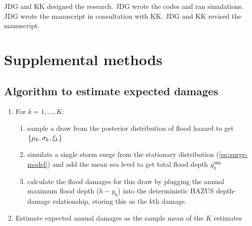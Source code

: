 \documentclass[12pt]{article}
\begin{document}
JDG and KK designed the research.
JDG wrote the codes and ran simulations.
JDG wrote the manuscript in consultation with KK.
JDG and KK revised the manuscript.

\printbibliography

\appendix
\newcommand{\hbAppendixPrefix}{S}
\renewcommand{\thefigure}{\hbAppendixPrefix\arabic{figure}}
\setcounter{figure}{0}
\renewcommand{\thetable}{\hbAppendixPrefix\arabic{table}}
\setcounter{table}{0}
\renewcommand{\theequation}{\hbAppendixPrefix\arabic{equation}}
\setcounter{equation}{0}

\newpage
\section{Supplemental methods}

\subsection{Algorithm to estimate expected damages}\label{sec:alg-ead}

\begin{enumerate}
    \item For $k=1, \ldots, K$:
          \begin{enumerate}
              \item sample a draw from the posterior distribution of flood hazard to get $\qty{ \mu_k, \sigma_k, \xi_k }$
              \item simulate a single storm surge from the stationary distribution (\cref{eq:surge-model}) and add the mean sea level to get total flood depth $y^\mathrm{sim}_k$
              \item calculate the flood damages for this draw by plugging the annual maximum flood depth ($h - y_k$) into  the deterministic HAZUS depth-damage relationship, storing this as the $k$th damage.
          \end{enumerate}
    \item Estimate expected annual damages as the sample mean of the $K$ estimates
\end{enumerate}
\end{document}
